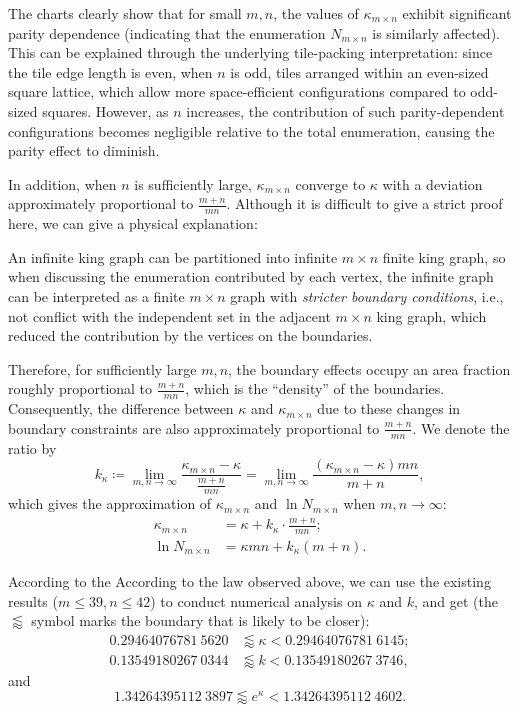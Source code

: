 \documentclass[11pt]{article}
\begin{document}
    The charts clearly show that for small $m,n$, the values of $\kappa_{m\times n}$ exhibit significant parity dependence (indicating that the enumeration $N_{m\times n}$ is similarly affected).
    This can be explained through the underlying tile-packing interpretation: since the tile edge length is even, when $n$ is odd, tiles arranged within an even-sized square lattice, which allow more space-efficient configurations compared to odd-sized squares.
    However, as $n$ increases, the contribution of such parity-dependent configurations becomes negligible relative to the total enumeration, causing the parity effect to diminish.

    In addition, when $n$ is sufficiently large, $\kappa_{m\times n}$ converge to $\kappa$ with a deviation approximately proportional to $\frac{m+n}{mn}$.
    Although it is difficult to give a strict proof here, we can give a physical explanation:

    An infinite king graph can be partitioned into infinite $m \times n$ finite king graph,
    so when discussing the enumeration contributed by each vertex, the infinite graph can be interpreted as a finite $m \times n$ graph with \textit{stricter boundary conditions}, i.e., not conflict with the independent set in the adjacent $m\times n$ king graph,
    which reduced the contribution by the vertices on the boundaries.

    Therefore, for sufficiently large $m,  n$, the {boundary effects} occupy an area fraction roughly proportional to $\frac{m+n}{mn}$, which is the ``density'' of the boundaries.
    Consequently, the difference between $\kappa$ and $\kappa_{m\times n}$ due to these changes in boundary constraints are also approximately proportional to $\frac{m+n}{mn}$.
    We denote the ratio by
    \[
        k_{\kappa}\coloneq \lim_{m,n\rightarrow\infty} \frac{\kappa_{m\times n}-\kappa}{\frac{m+n}{mn}} =\lim_{m,n\rightarrow\infty} \frac{(\kappa_{m\times n}-\kappa)mn}{m+n},
    \]
    which gives the approximation of $\kappa_{m\times n}$ and $\ln N_{m\times n}$ when $m,n\rightarrow\infty$:
    \begin{align}\label{eq:kappa_mn}
        \kappa_{m\times n} &=\kappa+k_{\kappa}\cdot\frac{m+n}{mn};       \\
        \ln N_{m\times n}  &= \kappa mn+k_{\kappa}(m+n).
    \end{align}

    According to the According to the law observed above, we can use the existing results ($m\leq39, n\leq42$) to conduct numerical analysis on $\kappa$ and $k$, and get (the $\lessapprox$ symbol marks the boundary that is likely to be closer):
    \begin{align*}
        0.29464076781~5620 &\lessapprox\kappa< 0.29464076781~6145;\\
        0.13549180267~0344 &\lessapprox k     <0.13549180267~3746,
    \end{align*}
    and
    \[
        1.34264395112~3897 \lessapprox e^\kappa< 1.34264395112~4602.
    \]
\end{document}
